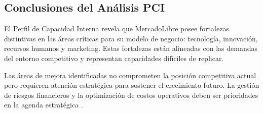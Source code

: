 \subsection{Conclusiones del Análisis PCI}

El Perfil de Capacidad Interna revela que MercadoLibre posee fortalezas distintivas en las áreas críticas para su modelo de negocio: tecnología, innovación, recursos humanos y marketing. Estas fortalezas están alineadas con las demandas del entorno competitivo y representan capacidades difíciles de replicar.

Las áreas de mejora identificadas no comprometen la posición competitiva actual pero requieren atención estratégica para sostener el crecimiento futuro. La gestión de riesgos financieros y la optimización de costos operativos deben ser prioridades en la agenda estratégica \autocite{barney1991, teece2007, grant2016}.
